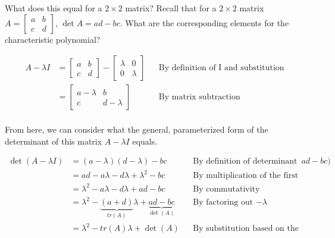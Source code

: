 \documentclass[10pt,letterpaper,final]{report}
\newcommand{\reason}[1]{&& \text{#1}}
\begin{document}
What does this equal for a $2 \times 2$ matrix? Recall that for a $2 \times 2$ matrix $A = \begin{bmatrix}
    a & b \\
    c & d
  \end{bmatrix}$, $\det A = ad - bc$.
What are the corresponding elements for the characteristic polynomial?

\begin{align*}
  A - \lambda I & = \begin{bmatrix}
                      a & b \\
                      c & d
                    \end{bmatrix} - \begin{bmatrix}
                                      \lambda & 0       \\
                                      0       & \lambda
                                    \end{bmatrix} \reason{By definition of I and substitution} \\[1ex]
                & = \begin{bmatrix}
                      a - \lambda & b           \\
                      c           & d - \lambda
                    \end{bmatrix}  \reason{By matrix subtraction}                              \\[1ex]
\end{align*}

From here, we can consider what the general, parameterized form of the determinant of this matrix $A - \lambda I$ equals.

\begin{align*}
  \det (A - \lambda I) & = (a - \lambda) (d - \lambda) - bc \reason{By definition of determinant ($ad - bc$)}                                     \\
                       & = ad - a \lambda - d \lambda + \lambda^2 - bc \reason{By multiplication of the first two terms}                          \\
                       & = \lambda^2 - a \lambda - d \lambda + ad - bc \reason{By commutativity}                                                  \\
                       & = \lambda^2 - \underbrace{(a + d)}_{tr(A)} \lambda + \underbrace{ad - bc}_{\det(A)} \reason{By factoring out $-\lambda$} \\
                       & = \lambda^2 - tr(A) \lambda + \det(A) \reason{By substitution based on the identities noted}                             \\
\end{align*}
\end{document}
